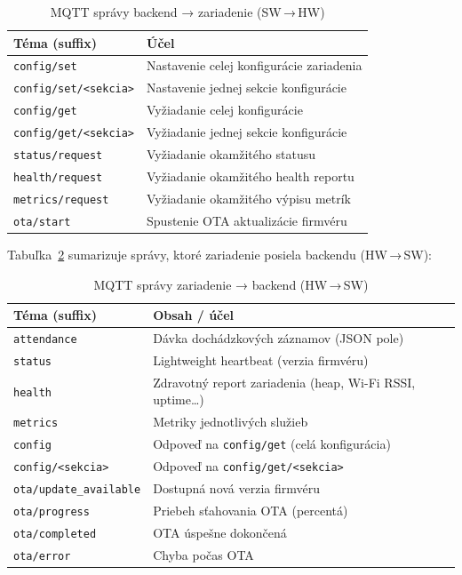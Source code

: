 \begin{table}[h!]
  \centering
  \caption{MQTT správy backend → zariadenie (SW\,→\,HW)}
  \label{tab:mqtt-sw-hw}
  \begin{tabular}{lp{9cm}}
    \toprule
    Téma (suffix) & Účel \\
    \midrule
    \texttt{config/set} & Nastavenie celej konfigurácie zariadenia \\
    \texttt{config/set/<sekcia>} & Nastavenie jednej sekcie konfigurácie \\
    \texttt{config/get} & Vyžiadanie celej konfigurácie \\
    \texttt{config/get/<sekcia>} & Vyžiadanie jednej sekcie konfigurácie \\
    \texttt{status/request} & Vyžiadanie okamžitého statusu \\
    \texttt{health/request} & Vyžiadanie okamžitého health reportu \\
    \texttt{metrics/request} & Vyžiadanie okamžitého výpisu metrík \\
    \texttt{ota/start} & Spustenie OTA aktualizácie firmvéru \\
    \bottomrule
  \end{tabular}
\end{table}

Tabuľka~\ref{tab:mqtt-hw-sw} sumarizuje správy, ktoré zariadenie posiela backendu (HW\,→\,SW):

\begin{table}[h!]
  \centering
  \caption{MQTT správy zariadenie → backend (HW\,→\,SW)}
  \label{tab:mqtt-hw-sw}
  \begin{tabular}{lp{9cm}}
    \toprule
    Téma (suffix) & Obsah / účel \\
    \midrule
    \texttt{attendance} & Dávka dochádzkových záznamov (JSON pole) \\
    \texttt{status} & Lightweight heartbeat (verzia firmvéru) \\
    \texttt{health} & Zdravotný report zariadenia (heap, Wi-Fi RSSI, uptime\ldots) \\
    \texttt{metrics} & Metriky jednotlivých služieb \\
    \texttt{config} & Odpoveď na \texttt{config/get} (celá konfigurácia) \\
    \texttt{config/<sekcia>} & Odpoveď na \texttt{config/get/<sekcia>} \\
    \texttt{ota/update\_available} & Dostupná nová verzia firmvéru \\
    \texttt{ota/progress} & Priebeh sťahovania OTA (percentá) \\
    \texttt{ota/completed} & OTA úspešne dokončená \\
    \texttt{ota/error} & Chyba počas OTA \\
    \bottomrule
  \end{tabular}
\end{table}

